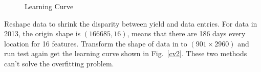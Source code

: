 \documentclass[conference]{IEEEtran}
\begin{document}
\begin{figure}[!htb]
  \centering
{}
\hfill
{}
\label{fig:lc} 
\caption{Learning Curve}
\end{figure}

Reshape data to shrink the disparity between yield and data entries. For data in 2013, the origin shape is $(166685,16)$, means that there are 186 days every location for 16 features. Transform the shape of data in to $(901\times2960)$ and run test again get the learning curve shown in Fig.~\ref{cv2}. These two methods can't solve the overfitting problem.
\end{document}
